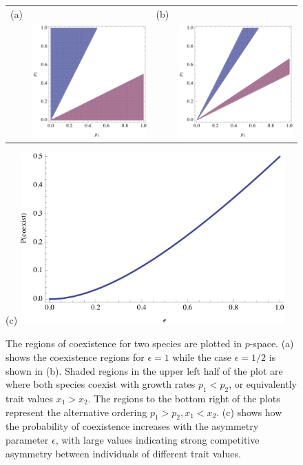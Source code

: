 \begin{figure}[htbp]
\centering
   \begin{tabular}{rrrr}
  (a) & & (b) &  \\ &  \includegraphics[width=2.2in]{Figure1a} & & \includegraphics[width=2.2in]{Figure1b} \end{tabular}
 (c)
 \includegraphics[width=4in]{Figure1c}
   \caption{The regions of coexistence for two species are plotted in $p$-space. (a) shows the coexistence regions for $\epsilon=1$ while the case $\epsilon=1/2$ is shown in (b). Shaded regions in the upper left half of the plot are where both species coexist with growth rates $p_1<p_2$, or equivalently trait values $x_1>x_2$. The  regions to the bottom right of the plots represent the alternative ordering $p_1>p_2, x_1<x_2$. (c) shows how the probability of coexistence increases with the asymmetry parameter $\epsilon$, with large values indicating strong competitive asymmetry between individuals of different trait values.}
 \label{fig:2d}
\end{figure}

